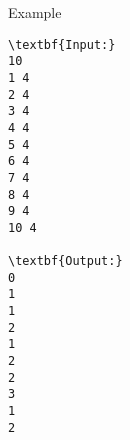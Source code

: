 Example
\begin{verbatim}
\textbf{Input:}
10
1 4
2 4
3 4
4 4
5 4
6 4
7 4
8 4
9 4
10 4

\textbf{Output:}
0
1
1
2
1
2
2
3
1
2
\end{verbatim}